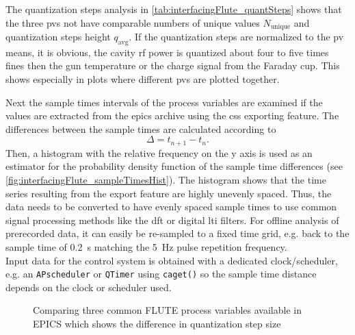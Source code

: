 The quantization steps analysis in \autoref{tab:interfacingFlute_quantSteps} shows that the three \glspl{pv} not have comparable numbers of unique values $N_\text{unique}$ and quantization steps height $q_\text{avg}$. If the quantization steps are normalized to the \gls{pv} means, it is obvious, the cavity \gls{rf} power is quantized about four to five times fines then the gun temperature or the charge signal from the Faraday cup. This shows especially in plots where different \glspl{pv} are plotted together.

Next the sample times intervals of the process variables are examined if the values are extracted from the \gls{epics} archive using the \gls{css} exporting feature. The differences between the sample times are calculated according to
\begin{equation}
\Delta=t_{n+1}-t_n.
\end{equation}
Then, a histogram with the relative frequency on the y axis is used as an estimator for the probability density function of the sample time differences (see \autoref{fig:interfacingFlute_sampleTimesHist}). The histogram shows that the time series resulting from the export feature are highly unevenly spaced. Thus, the data needs to be converted to have evenly spaced sample times to use common signal processing methods like the \gls{dft} or digital \gls{lti} filters. For offline analysis of prerecorded data, it can easily be re-sampled to a fixed time grid, e.g. back to the sample time of \SI{0.2}{\second} matching the \SI{5}{\hertz} pulse repetition frequency.\\
Input data for the control system is obtained with a dedicated clock/scheduler, e.g. an \texttt{APscheduler} or \texttt{QTimer} using \texttt{caget()} so the sample time distance depends on the clock or scheduler used.

\begin{figure}[H]
\centering
		\hfill
        
        \hfill
        
        \hfill
       \caption[Comparing three common FLUTE process variables available in EPICS]{Comparing three common FLUTE process variables available in EPICS which shows the difference in quantization step size}
    \label{fig:quantNoise}
\end{figure}

